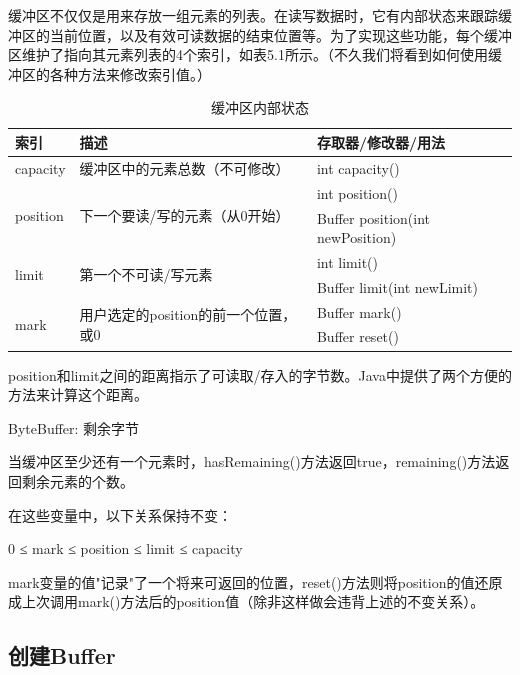 		缓冲区不仅仅是用来存放一组元素的列表。在读写数据时，它有内部状态来跟踪缓冲区的当前位置，以及有效可读数据的结束位置等。为了实现这些功能，每个缓冲区维护了指向其元素列表的4个索引，如表5.1所示。（不久我们将看到如何使用缓冲区的各种方法来修改索引值。） 

		\begin{table}[htbp]
			\caption{缓冲区内部状态}
			\label{tab:state.of.buffer}
			\centering
			\begin{tabular}{lll}
				\hline
					索引 & 描述   & 存取器/修改器/用法 \\
				\hline
					capacity & 缓冲区中的元素总数（不可修改） & int capacity() \\
				\hline
					\multirow{2}{*}{position } & 
					\multirow{2}{*}{下一个要读/写的元素（从0开始）} & 
					int position() \\

					& & Buffer position(int newPosition) \\
				\hline
					\multirow{2}{*}{ limit} & 
					\multirow{2}{*}{ 第一个不可读/写元素} & 
					int limit() \\

					& & Buffer limit(int newLimit) \\
				\hline
					\multirow{2}{*}{mark} & 
					\multirow{2}{*}{用户选定的position的前一个位置，或0}  & 
					Buffer mark() \\

					&  & Buffer reset() \\
				\hline
			\end{tabular}
		\end{table}

		position和limit之间的距离指示了可读取/存入的字节数。Java中提供了两个方便的方法来计算这个距离。 

		ByteBuffer: 剩余字节 

		

		当缓冲区至少还有一个元素时，hasRemaining()方法返回true，remaining()方法返回剩余元素的个数。 

		在这些变量中，以下关系保持不变： 

		0 ≤ mark ≤ position ≤ limit ≤ capacity 

		mark变量的值"记录"了一个将来可返回的位置，reset()方法则将position的值还原成上次调用mark()方法后的position值（除非这样做会违背上述的不变关系）。 

	\subsection{创建Buffer} 

